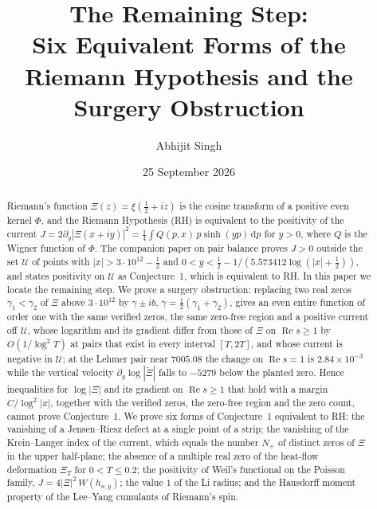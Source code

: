 \documentclass[11pt]{article}
\title{\textbf{The Remaining Step:}\\[4pt]
\large Six Equivalent Forms of the Riemann Hypothesis and the Surgery Obstruction}
\author{Abhijit Singh}
\date{25 September 2026}
\theoremstyle{definition}\newtheorem{definition}[theorem]{Definition}
\theoremstyle{remark}\newtheorem{remark}[theorem]{Remark}
\newcommand{\dd}{\,\mathrm d}\newcommand{\e}{\mathrm e}
\renewcommand{\Re}{\operatorname{Re}}\renewcommand{\Im}{\operatorname{Im}}
\begin{document}
\maketitle
\begin{abstract}
Riemann's function $\Xi(z)=\xi(\frac12+iz)$ is the cosine transform of a positive even kernel $\Phi$, and the Riemann Hypothesis (RH) is equivalent to the positivity of the current $J=2\partial_y|\Xi(x+iy)|^2=\frac14\int Q(p,x)\,p\sinh(yp)\dd p$ for $y>0$, where $Q$ is the Wigner function of $\Phi$. The companion paper on pair balance proves $J>0$ outside the set $\mathcal U$ of points with $|x|>3\cdot10^{12}-\frac12$ and $0<y<\frac12-1/(5.573412\log(|x|+\frac12))$, and states positivity on $\mathcal U$ as Conjecture~1, which is equivalent to RH. In this paper we locate the remaining step. We prove a surgery obstruction: replacing two real zeros $\gamma_1<\gamma_2$ of $\Xi$ above $3\cdot10^{12}$ by $\gamma\pm ib$, $\gamma=\frac12(\gamma_1+\gamma_2)$, gives an even entire function of order one with the same verified zeros, the same zero-free region and a positive current off $\mathcal U$, whose logarithm and its gradient differ from those of $\Xi$ on $\Re s\ge1$ by $O(1/\log^2T)$ at pairs that exist in every interval $[T,2T]$, and whose current is negative in $\mathcal U$; at the Lehmer pair near $7005.08$ the change on $\Re s=1$ is $2.84\times10^{-3}$ while the vertical velocity $\partial_y\log|\widetilde\Xi|$ falls to $-5279$ below the planted zero. Hence inequalities for $\log|\Xi|$ and its gradient on $\Re s\ge1$ that hold with a margin $C/\log^2|x|$, together with the verified zeros, the zero-free region and the zero count, cannot prove Conjecture~1. We prove six forms of Conjecture~1 equivalent to RH: the vanishing of a Jensen--Riesz defect at a single point of a strip; the vanishing of the Krein--Langer index of the current, which equals the number $N_+$ of distinct zeros of $\Xi$ in the upper half-plane; the absence of a multiple real zero of the heat-flow deformation $\Xi_T$ for $0<T\le0.2$; the positivity of Weil's functional on the Poisson family, $J=4|\Xi|^2\,W(h_{x,y})$; the value $1$ of the Li radius; and the Hausdorff moment property of the Lee--Yang cumulants of Riemann's spin.


\end{abstract}
\end{document}
